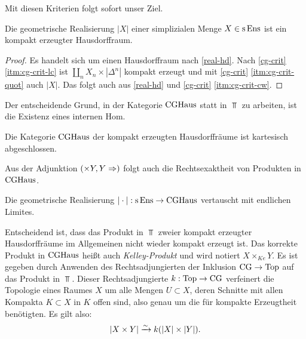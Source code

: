 Mit diesen Kriterien folgt sofort unser Ziel.
\begin{kor}
  Die geometrische Realisierung $|X|$ einer simplizialen Menge $X \in
  \operatorname{s}\operatorname{Ens}$ ist ein kompakt erzeugter Hausdorffraum.
\end{kor}
\begin{proof}
  Es handelt sich um einen Hausdorffraum nach \ref{real-hd}. Nach
  \ref{cg-crit} \ref{itm:cg-crit-lc} ist $\coprod_n X_n \times
  |\Delta^n|$ kompakt erzeugt und mit \ref{cg-crit}
  \ref{itm:cg-crit-quot} auch $|X|$. Das folgt auch aus \ref{real-hd}
  und \ref{cg-crit} \ref{itm:cg-crit-cw}.
\end{proof}

Der entscheidende Grund, in der Kategorie $\operatorname{CGHaus}$ statt in $\Top$ zu
arbeiten, ist die Existenz eines internen Hom.
\begin{theorem}
  \label{cghaus-cart-closed}
  Die Kategorie $\operatorname{CGHaus}$ der kompakt erzeugten Hausdorffräume ist
  kartesisch abgeschlossen.
\end{theorem}
Aus der Adjunktion $(\times Y, Y \Rightarrow)$ folgt auch die
Rechtsexaktheit von Produkten in $\operatorname{CGHaus}$.
\begin{satz} \label{real-products}
  Die geometrische Realisierung $|\cdot|: \operatorname{s}\operatorname{Ens} \to \operatorname{CGHaus}$
  vertauscht mit endlichen Limites.
\end{satz}
\begin{bem}
   Entscheidend ist, dass das Produkt in $\Top$ zweier kompakt
   erzeugter Hausdorffräume im Allgemeinen nicht wieder kompakt
   erzeugt ist. Das korrekte Produkt in $\operatorname{CGHaus}$ heißt auch
   \emph{Kelley-Produkt} und wird notiert $X \times_{Ke} Y$. Es ist
   gegeben durch Anwenden des Rechtsadjungierten der Inklusion $\operatorname{CG}
   \to \operatorname{Top}$ auf das Produkt in $\Top$. Dieser Rechtsadjungierte $k:
   \operatorname{Top} \to \operatorname{CG}$ verfeinert die Topologie eines Raumes $X$ um alle
   Mengen $U \subset X$, deren Schnitte mit allen Kompakta $K \subset
   X$ in $K$ offen sind, also genau um die für kompakte Erzeugtheit
   benötigten. Es gilt also:
   \[ |X \times Y| \xrightarrow[]{\sim} k(|X| \times |Y|). \]
\end{bem}
